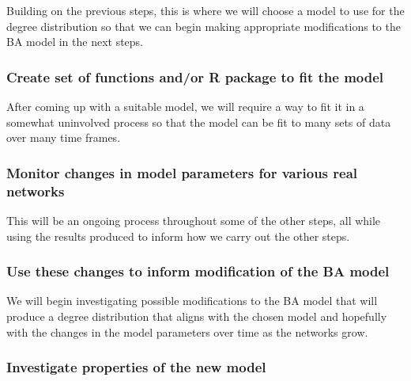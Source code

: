 \documentclass[
]{article}
\begin{document}
Building on the previous steps, this is where we will choose a model to
use for the degree distribution so that we can begin making appropriate
modifications to the BA model in the next steps.

\subsubsection*{Create set of functions and/or R package to fit the
model}\label{create-set-of-functions-andor-r-package-to-fit-the-model}

After coming up with a suitable model, we will require a way to fit it
in a somewhat uninvolved process so that the model can be fit to many
sets of data over many time frames.

\subsubsection*{Monitor changes in model parameters for various real
networks}\label{monitor-changes-in-model-parameters-for-various-real-networks}

This will be an ongoing process throughout some of the other steps, all
while using the results produced to inform how we carry out the other
steps.

\subsubsection*{Use these changes to inform modification of the BA
model}\label{use-these-changes-to-inform-modification-of-the-ba-model}

We will begin investigating possible modifications to the BA model that
will produce a degree distribution that aligns with the chosen model and
hopefully with the changes in the model parameters over time as the
networks grow.

\subsubsection*{Investigate properties of the new
model}\label{investigate-properties-of-the-new-model}
\end{document}
